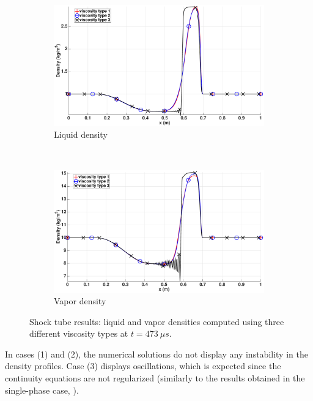 \begin{figure}[H]
        \centering
        \begin{subfigure}[b]{0.95\textwidth}
                \centering
                \includegraphics[width=\textwidth]{figures/relaxation_vapor_density_multiple_visc.eps}
                \caption{Liquid density}
                \label{fig:liq-density}
        \end{subfigure}
				\\
        \begin{subfigure}[b]{0.95\textwidth}
                \centering
                \includegraphics[width=\textwidth]{figures/relaxation_liquid_density_multiple_visc.eps}
                \caption{Vapor density}
                \label{fig:vap-density}
        \end{subfigure}
        \caption{Shock tube results: liquid and vapor densities computed using three different viscosity types at $t=473 \ \mu s$.}\label{fig:density}
\end{figure}
%
In cases (1) and (2), the numerical solutions do not display any instability in the density profiles. Case (3) displays oscillations, which is expected since the continuity equations are not regularized (similarly to the results obtained in the single-phase case, \cite{jlg_VR_SIAM_2004}).
